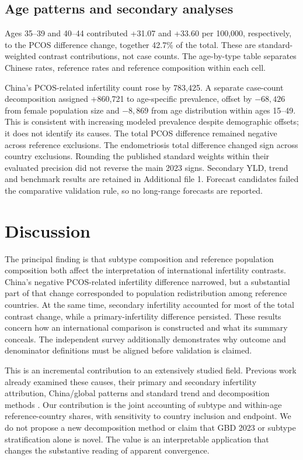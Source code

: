 \documentclass[11pt,a4paper]{article}
\begin{document}
\subsection{Age patterns and secondary analyses}
Ages 35--39 and 40--44 contributed +31.07 and +33.60 per 100,000, respectively, to the PCOS difference change, together 42.7\% of the total. These are standard-weighted contrast contributions, not case counts. The age-by-type table separates Chinese rates, reference rates and reference composition within each cell.

China's PCOS-related infertility count rose by 783,425. A separate case-count decomposition assigned +860,721 to age-specific prevalence, offset by $-68,426$ from female population size and $-8,869$ from age distribution within ages 15--49. This is consistent with increasing modeled prevalence despite demographic offsets; it does not identify its causes. The total PCOS difference remained negative across reference exclusions. The endometriosis total difference changed sign across country exclusions. Rounding the published standard weights within their evaluated precision did not reverse the main 2023 signs. Secondary YLD, trend and benchmark results are retained in Additional file 1. Forecast candidates failed the comparative validation rule, so no long-range forecasts are reported.


\section{Discussion}
The principal finding is that subtype composition and reference population composition both affect the interpretation of international infertility contrasts. China's negative PCOS-related infertility difference narrowed, but a substantial part of that change corresponded to population redistribution among reference countries. At the same time, secondary infertility accounted for most of the total contrast change, while a primary-infertility difference persisted. These results concern how an international comparison is constructed and what its summary conceals. The independent survey additionally demonstrates why outcome and denominator definitions must be aligned before validation is claimed.

This is an incremental contribution to an extensively studied field. Previous work already examined these causes, their primary and secondary infertility attribution, China/global patterns and standard trend and decomposition methods \cite{xu,lu,wang,feng}. Our contribution is the joint accounting of subtype and within-age reference-country shares, with sensitivity to country inclusion and endpoint. We do not propose a new decomposition method or claim that GBD 2023 or subtype stratification alone is novel. The value is an interpretable application that changes the substantive reading of apparent convergence.
\end{document}
